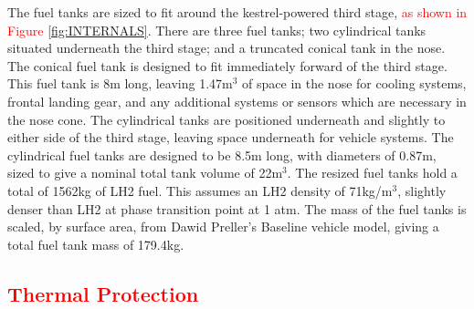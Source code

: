 		

		The fuel tanks are sized to fit around the kestrel-powered third stage, \textcolor{red}{as shown in Figure \ref{fig:INTERNALS}}. There are three fuel tanks; two cylindrical tanks situated underneath the third stage; and a truncated conical tank in the nose. The conical fuel tank is designed to fit immediately forward of the third stage. This fuel tank is 8m long, leaving 1.47m$^3$ of space in the nose for cooling systems, frontal landing gear, and any additional systems or sensors which are necessary in the nose cone. The cylindrical tanks are positioned underneath and slightly to either side of the third stage, leaving space underneath for vehicle systems. The cylindrical fuel tanks are designed to be 8.5m long, with diameters of 0.87m, sized to give a nominal total tank volume of 22m$^3$.
The resized fuel tanks hold a total of 1562kg of LH2 fuel. This assumes an LH2 density of 71kg/m$^3$, slightly denser than LH2 at phase transition point at 1 atm.
The mass of the fuel tanks is scaled, by surface area, from Dawid Preller's Baseline vehicle model\cite{Preller2017b}, giving a total fuel tank mass of 179.4kg.
		
		\textcolor{red}{
			\subsection{Thermal Protection}
				}
	

